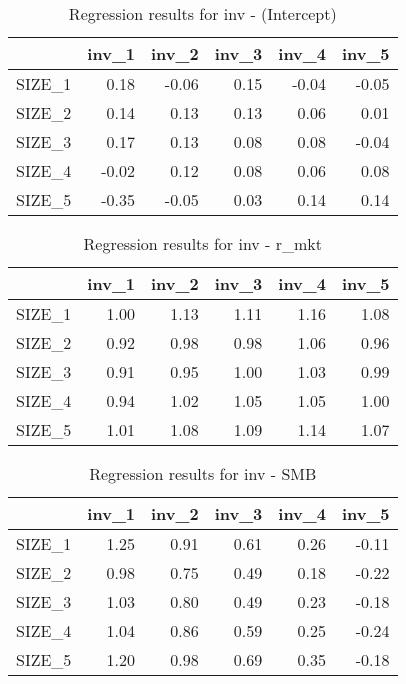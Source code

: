 \begin{table}[ht]
\centering
\caption{Regression results for inv - (Intercept)} 
\begin{tabular}{rrrrrr}
  \hline
 & inv\_1 & inv\_2 & inv\_3 & inv\_4 & inv\_5 \\ 
  \hline
SIZE\_1 & 0.18 & -0.06 & 0.15 & -0.04 & -0.05 \\ 
  SIZE\_2 & 0.14 & 0.13 & 0.13 & 0.06 & 0.01 \\ 
  SIZE\_3 & 0.17 & 0.13 & 0.08 & 0.08 & -0.04 \\ 
  SIZE\_4 & -0.02 & 0.12 & 0.08 & 0.06 & 0.08 \\ 
  SIZE\_5 & -0.35 & -0.05 & 0.03 & 0.14 & 0.14 \\ 
   \hline
\end{tabular}
\end{table}


\begin{table}[ht]
\centering
\caption{Regression results for inv - r_mkt} 
\begin{tabular}{rrrrrr}
  \hline
 & inv\_1 & inv\_2 & inv\_3 & inv\_4 & inv\_5 \\ 
  \hline
SIZE\_1 & 1.00 & 1.13 & 1.11 & 1.16 & 1.08 \\ 
  SIZE\_2 & 0.92 & 0.98 & 0.98 & 1.06 & 0.96 \\ 
  SIZE\_3 & 0.91 & 0.95 & 1.00 & 1.03 & 0.99 \\ 
  SIZE\_4 & 0.94 & 1.02 & 1.05 & 1.05 & 1.00 \\ 
  SIZE\_5 & 1.01 & 1.08 & 1.09 & 1.14 & 1.07 \\ 
   \hline
\end{tabular}
\end{table}


\begin{table}[ht]
\centering
\caption{Regression results for inv - SMB} 
\begin{tabular}{rrrrrr}
  \hline
 & inv\_1 & inv\_2 & inv\_3 & inv\_4 & inv\_5 \\ 
  \hline
SIZE\_1 & 1.25 & 0.91 & 0.61 & 0.26 & -0.11 \\ 
  SIZE\_2 & 0.98 & 0.75 & 0.49 & 0.18 & -0.22 \\ 
  SIZE\_3 & 1.03 & 0.80 & 0.49 & 0.23 & -0.18 \\ 
  SIZE\_4 & 1.04 & 0.86 & 0.59 & 0.25 & -0.24 \\ 
  SIZE\_5 & 1.20 & 0.98 & 0.69 & 0.35 & -0.18 \\ 
   \hline
\end{tabular}
\end{table}


